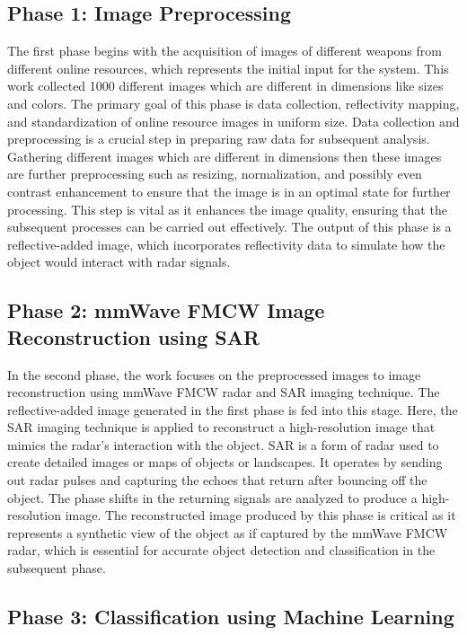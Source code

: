 \documentclass[journal,article,submit,pdftex,moreauthors]{Definitions/mdpi}
\begin{document}
\subsection*{Phase 1: Image Preprocessing}

The first phase begins with the acquisition of images of different weapons from different online resources, which represents the initial input for the system. This work collected 1000 different images which are different in dimensions like sizes and colors. The primary goal of this phase is data collection, reflectivity mapping, and standardization of online resource images in uniform size. Data collection and preprocessing is a crucial step in preparing raw data for subsequent analysis. Gathering different images which are different in dimensions then these images are further preprocessing such as resizing, normalization, and possibly even contrast enhancement to ensure that the image is in an optimal state for further processing. This step is vital as it enhances the image quality, ensuring that the subsequent processes can be carried out effectively. The output of this phase is a reflective-added image, which incorporates reflectivity data to simulate how the object would interact with radar signals.

\subsection*{Phase 2: mmWave FMCW Image Reconstruction using SAR}

In the second phase, the work focuses on the preprocessed images to image reconstruction using mmWave FMCW radar and SAR imaging technique. The reflective-added image generated in the first phase is fed into this stage. Here, the SAR imaging technique is applied to reconstruct a high-resolution image that mimics the radar's interaction with the object. SAR is a form of radar used to create detailed images or maps of objects or landscapes. It operates by sending out radar pulses and capturing the echoes that return after bouncing off the object. The phase shifts in the returning signals are analyzed to produce a high-resolution image. The reconstructed image produced by this phase is critical as it represents a synthetic view of the object as if captured by the mmWave FMCW radar, which is essential for accurate object detection and classification in the subsequent phase.

\subsection*{Phase 3: Classification using Machine Learning}
\end{document}
